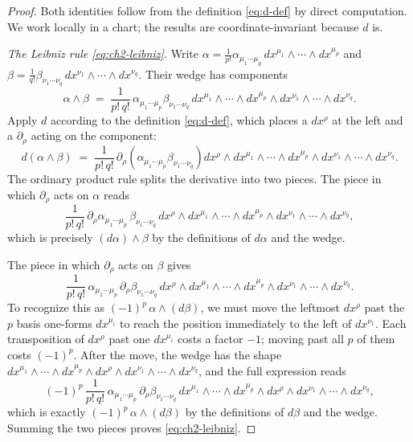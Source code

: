 \begin{proof}
Both identities follow from the definition \eqref{eq:d-def} by direct computation. We work locally in a chart; the results are coordinate-invariant because $d$ is.

\medskip

\noindent \emph{The Leibniz rule \eqref{eq:ch2-leibniz}.} Write $\alpha = \frac{1}{p!}\alpha_{\mu_1\cdots\mu_p}\,dx^{\mu_1}\wedge\cdots\wedge dx^{\mu_p}$ and $\beta = \frac{1}{q!}\beta_{\nu_1\cdots\nu_q}\,dx^{\nu_1}\wedge\cdots\wedge dx^{\nu_q}$. Their wedge has components
\begin{equation*}
\alpha \wedge \beta \;=\; \frac{1}{p!\,q!}\,\alpha_{\mu_1\cdots\mu_p}\beta_{\nu_1\cdots\nu_q}\,dx^{\mu_1}\wedge\cdots\wedge dx^{\mu_p}\wedge dx^{\nu_1}\wedge\cdots\wedge dx^{\nu_q}.
\end{equation*}
Apply $d$ according to the definition \eqref{eq:d-def}, which places a $dx^\rho$ at the left and a $\partial_\rho$ acting on the component:
\begin{equation*}
d(\alpha \wedge \beta) \;=\; \frac{1}{p!\,q!}\,\partial_\rho\!\left(\alpha_{\mu_1\cdots\mu_p}\beta_{\nu_1\cdots\nu_q}\right) dx^\rho \wedge dx^{\mu_1}\wedge\cdots\wedge dx^{\mu_p}\wedge dx^{\nu_1}\wedge\cdots\wedge dx^{\nu_q}.
\end{equation*}
The ordinary product rule splits the derivative into two pieces. The piece in which $\partial_\rho$ acts on $\alpha$ reads
\begin{equation*}
\frac{1}{p!\,q!}\,\partial_\rho \alpha_{\mu_1\cdots\mu_p}\,\beta_{\nu_1\cdots\nu_q}\,dx^\rho \wedge dx^{\mu_1}\wedge\cdots\wedge dx^{\mu_p}\wedge dx^{\nu_1}\wedge\cdots\wedge dx^{\nu_q},
\end{equation*}
which is precisely $(d\alpha)\wedge\beta$ by the definitions of $d\alpha$ and the wedge.

\medskip

\noindent The piece in which $\partial_\rho$ acts on $\beta$ gives
\begin{equation*}
\frac{1}{p!\,q!}\,\alpha_{\mu_1\cdots\mu_p}\,\partial_\rho\beta_{\nu_1\cdots\nu_q}\,dx^\rho \wedge dx^{\mu_1}\wedge\cdots\wedge dx^{\mu_p}\wedge dx^{\nu_1}\wedge\cdots\wedge dx^{\nu_q}.
\end{equation*}
To recognize this as $(-1)^p\,\alpha\wedge(d\beta)$, we must move the leftmost $dx^\rho$ past the $p$ basis one-forms $dx^{\mu_i}$ to reach the position immediately to the left of $dx^{\nu_1}$. Each transposition of $dx^\rho$ past one $dx^{\mu_i}$ costs a factor $-1$; moving past all $p$ of them costs $(-1)^p$. After the move, the wedge has the shape $dx^{\mu_1}\wedge\cdots\wedge dx^{\mu_p}\wedge dx^\rho\wedge dx^{\nu_1}\wedge\cdots\wedge dx^{\nu_q}$, and the full expression reads
\begin{equation*}
(-1)^p\,\frac{1}{p!\,q!}\,\alpha_{\mu_1\cdots\mu_p}\,\partial_\rho\beta_{\nu_1\cdots\nu_q}\,dx^{\mu_1}\wedge\cdots\wedge dx^{\mu_p}\wedge dx^\rho \wedge dx^{\nu_1}\wedge\cdots\wedge dx^{\nu_q},
\end{equation*}
which is exactly $(-1)^p\,\alpha\wedge(d\beta)$ by the definitions of $d\beta$ and the wedge. Summing the two pieces proves \eqref{eq:ch2-leibniz}.


\end{proof}
